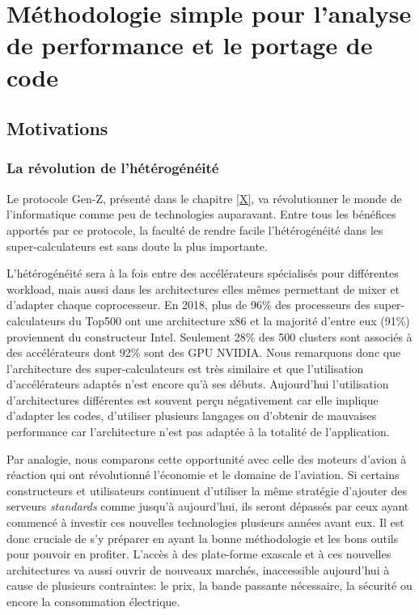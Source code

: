 \chapter{Méthodologie simple pour l'analyse de performance et le portage de code}
\label{chap:methodo}
\minitoc


\section{Motivations}


\subsection{La révolution de l'hétérogénéité}

Le protocole Gen-Z, présenté dans le chapitre \ref{X}, va révolutionner le monde de l'informatique comme peu de technologies auparavant. Entre tous les bénéfices apportés par ce protocole, la faculté de rendre facile l'hétérogénéité dans les super-calculateurs est sans doute la plus importante. 

L'hétérogénéité sera à la fois entre des accélérateurs spécialisés pour différentes workload, mais aussi dans les architectures elles mêmes permettant de mixer et d'adapter chaque coprocesseur. En 2018, plus de 96\% des processeurs des super-calculateurs du Top500 ont une architecture x86 et la majorité d'entre eux (91\%) proviennent du constructeur Intel. Seulement 28\% des 500 clusters sont associés à des accélérateurs dont 92\% sont des GPU NVIDIA. Nous remarquons donc que l'architecture des super-calculateurs est très similaire et que l'utilisation d'accélérateurs adaptés n'est encore qu'à ses débuts. Aujourd'hui l'utilisation d'architectures différentes est souvent perçu négativement car elle implique d'adapter les codes, d'utiliser plusieurs langages ou d'obtenir de mauvaises performance car l'architecture n'est pas adaptée à la totalité de l'application.

Par analogie, nous comparons cette opportunité avec celle des moteurs d'avion à réaction qui ont révolutionné l'économie et le domaine de l'aviation. Si certains constructeurs et utilisateurs continuent d'utiliser la même stratégie d'ajouter des serveurs \textit{standards} comme jusqu'à aujourd'hui, ils seront dépassés par ceux ayant commencé à investir ces nouvelles technologies plusieurs années avant eux. Il est donc cruciale de s'y préparer en ayant la bonne méthodologie et les bons outils pour pouvoir en profiter. L'accès à des plate-forme exascale et à ces nouvelles architectures va aussi ouvrir de nouveaux marchés, inaccessible aujourd'hui à cause de plusieurs contraintes: le prix, la bande passante nécessaire, la sécurité ou encore la consommation électrique. 

